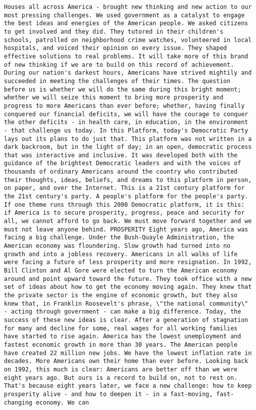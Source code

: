 \documentclass[
]{article}
\begin{document}
\begin{verbatim}
Houses all across America - brought new thinking and new action to our most pressing challenges. We used government as a catalyst to engage the best ideas and energies of the American people. We asked citizens to get involved and they did. They tutored in their children's schools, patrolled on neighborhood crime watches, volunteered in local hospitals, and voiced their opinion on every issue. They shaped effective solutions to real problems. It will take more of this brand of new thinking if we are to build on this record of achievement. During our nation's darkest hours, Americans have strived mightily and succeeded in meeting the challenges of their times. The question before us is whether we will do the same during this bright moment; whether we will seize this moment to bring more prosperity and progress to more Americans than ever before; whether, having finally conquered our financial deficits, we will have the courage to conquer the other deficits - in health care, in education, in the environment - that challenge us today. In this Platform, today's Democratic Party lays out its plans to do just that. This platform was not written in a dark backroom, but in the light of day; in an open, democratic process that was interactive and inclusive. It was developed both with the guidance of the brightest Democratic leaders and with the voices of thousands of ordinary Americans around the country who contributed their thoughts, ideas, beliefs, and dreams to this platform in person, on paper, and over the Internet. This is a 21st century platform for the 21st century's party. A people's platform for the people's party. If one theme runs through this 2000 Democratic platform, it is this: if America is to secure prosperity, progress, peace and security for all, we cannot afford to go back. We must move forward together and we must not leave anyone behind. PROSPERITY Eight years ago, America was facing a big challenge. Under the Bush-Quayle Administration, the American economy was floundering. Slow growth had turned into no growth and into a jobless recovery. Americans in all walks of life were facing a future of less prosperity and more resignation. In 1992, Bill Clinton and Al Gore were elected to turn the American economy around and point upward toward the future. They took office with a new set of ideas about how to get the economy moving again. They knew that the private sector is the engine of economic growth, but they also knew that, in Franklin Roosevelt's phrase, \"the national community\" - acting through government - can make a big difference. Today, the success of these new ideas is clear. After a generation of stagnation for many and decline for some, real wages for all working families have started to rise again. America has the lowest unemployment and fastest economic growth in more than 30 years. The American people have created 22 million new jobs. We have the lowest inflation rate in decades. More Americans own their home than ever before. Looking back on 1992, this much is clear: Americans are better off than we were eight years ago. But ours is a record to build on, not to rest on. That's because eight years later, we face a new challenge: how to keep prosperity alive - and how to deepen it - in a fast-moving, fast-changing economy. We can 
\end{verbatim}
\end{document}

